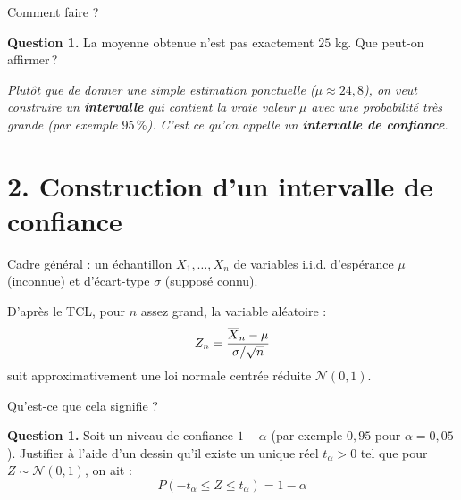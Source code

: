 \medskip

Comment faire ? 

\medskip

\textbf{Question 1.} La moyenne obtenue n'est pas exactement $25$ kg. Que peut-on affirmer\,?


\begin{center}
\begin{mdframed}[backgroundcolor=ThemeLight, linecolor=Theme,
  linewidth=1.5pt, innertopmargin=10pt, innerbottommargin=10pt]
\centering\large\itshape
Plutôt que de donner une simple estimation ponctuelle ($\mu \approx 24{,}8$), on veut construire un \textbf{intervalle} qui contient la vraie valeur $\mu$ avec une probabilité très grande (par exemple $95\,\%$). 
C'est ce qu'on appelle un \textbf{intervalle de confiance}.
\end{mdframed}
\end{center}

\section*{2. Construction d'un intervalle de confiance}

Cadre général : un échantillon $X_1, \dots, X_n$ de variables i.i.d. d'espérance $\mu$ (inconnue) et d'écart-type $\sigma$ (supposé connu). 

D'après le TCL, pour $n$ assez grand, la variable aléatoire :
\[
  Z_n = \dfrac{\overline{X}_n - \mu}{\sigma / \sqrt{n}}
\]
suit approximativement une loi normale centrée réduite $\mathcal{N}(0,1)$.

\medskip
Qu'est-ce que cela signifie ? 

\atrou[2.5cm]{


}

\textbf{Question 1.} Soit un niveau de confiance $1 - \alpha$ (par exemple $0{,}95$ pour $\alpha = 0{,}05$). Justifier à l'aide d'un dessin qu'il existe un unique réel $t_\alpha > 0$ tel que pour $Z \sim \mathcal{N}(0,1)$, on ait :
\[ P(-t_\alpha \le Z \le t_\alpha) = 1 - \alpha \]


